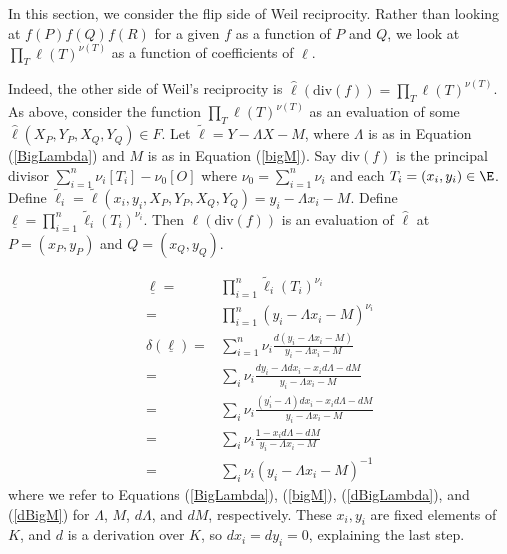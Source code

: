 \documentclass[11pt,letterpaper]{article}
\theoremstyle{definition}
\newcommand{\6}{\mathbf}
\newcommand{\7}{\mathcal}
\begin{document}
In this section, we consider the flip side of Weil reciprocity. Rather than looking at $f(P)f(Q)f(R)$ for a given $f$ as a function of $P$ and $Q$, we look at $\prod_T \ell(T)^{\nu(T)}$ as a function of coefficients of $\ell$.

Indeed, the other side of Weil's reciprocity is $\widehat{\ell}(\text{div}(f)) = \prod_T \ell(T)^{\nu(T)}$.
As above, consider the function $\prod_T \ell(T)^{\nu(T)}$ as an evaluation of some $\widehat{\ell}(X_P, Y_P, X_Q, Y_Q) \in F$. 
Let $\widetilde{\ell} = Y - \Lambda X - M$, where $\Lambda$ is as in Equation (\ref{BigLambda}) and $M$ is as in Equation (\ref{bigM}). Say $\text{div}(f)$ is the principal divisor $\sum_{i=1}^{n} \nu_i [T_i] - \nu_0[O]$ where $\nu_0 = \sum_{i=1}^{n} \nu_i$ and each $T_i = (x_i, y_i) \in \E$. Define $\widetilde{\ell}_i = \widetilde{\ell}(x_i, y_i, X_P, Y_P, X_Q, Y_Q) = y_i - \Lambda x_i - M$. Define $\underline{\ell} = \prod_{i=1}^{n} \widetilde{\ell}_i(T_i)^{\nu_i}$. 
Then $\ell(\text{div}(f))$ is an evaluation of $\widehat{\ell}$ at $P = (x_P, y_P)$ and $Q=(x_Q, y_Q)$.  

\begin{align}
\underline{\ell} =& \prod_{i=1}^{n} \widetilde{\ell}_i(T_i)^{\nu_i} \\
=& \prod_{i=1}^{n} (y_i - \Lambda x_i - M)^{\nu_i}\\
\delta(\underline{\ell}) =& \sum_{i=1}^{n} \nu_i \frac{d\left(y_i - \Lambda x_i - M\right)}{y_i - \Lambda x_i - M} \\
=& \sum_i \nu_i \frac{dy_i - \Lambda dx_i - x_i d\Lambda - dM}{y_i - \Lambda x_i - M}\\
=& \sum_i \nu_i \frac{(y_i^\prime - \Lambda)dx_i - x_i d\Lambda - dM}{y_i - \Lambda x_i - M} \\
=& \sum_i \nu_i \frac{1 - x_i d\Lambda - dM}{y_i - \Lambda x_i - M} \\
=& \sum_i \nu_i (y_i - \Lambda x_i - M)^{-1}  \label{delta_ell}
\end{align} where we refer to Equations (\ref{BigLambda}), (\ref{bigM}), (\ref{dBigLambda}), and (\ref{dBigM}) for $\Lambda$, $M$, $d\Lambda$, and $dM$, respectively.
These $x_i, y_i$ are fixed elements of $K$, and $d$ is a derivation over $K$, so $dx_i = dy_i = 0$, explaining the last step. 






\end{document}
